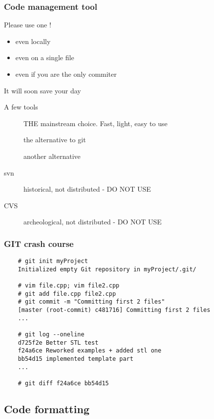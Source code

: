 \begin{frame}[fragile]
  \frametitle{Code management tool}
  \begin{alertblock}{Please use one !}
    \begin{itemize}
    \item even locally
    \item even on a single file
    \item even if you are the only commiter
    \end{itemize}
    It will soon save your day
  \end{alertblock}
  \begin{block}{A few tools}
    \begin{description}
    \item[\href{http://git-scm.com/}{}]
      THE mainstream choice. Fast, light, easy to use
    \item[\href{http://mercurial.selenic.com/}{}]
      the alternative to git
    \item[\href{http://bazaar.canonical.com/en/}{}]
      another alternative
    \item[svn]
      historical, not distributed - DO NOT USE
    \item[CVS]
      archeological, not distributed - DO NOT USE
    \end{description}
  \end{block}
\end{frame}

\begin{frame}[fragile]
  \frametitle{GIT crash course}
  \begin{verbatim}
    # git init myProject
    Initialized empty Git repository in myProject/.git/

    # vim file.cpp; vim file2.cpp
    # git add file.cpp file2.cpp
    # git commit -m "Committing first 2 files"
    [master (root-commit) c481716] Committing first 2 files
    ...

    # git log --oneline
    d725f2e Better STL test
    f24a6ce Reworked examples + added stl one
    bb54d15 implemented template part
    ...

    # git diff f24a6ce bb54d15
  \end{verbatim}
\end{frame}

\subsection[format]{Code formatting}

